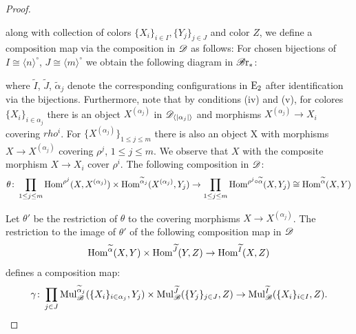 \begin{proof}
\begin{center}
        \end{center}
    along with collection of colors $\{X_i\}_{i \in I}, \{Y_j\}_{j \in J}$ and
    color $Z$, we define a composition map via the composition in $\mathscr{D}$ as
    follows: For chosen bijections of $I \cong \langle n \rangle^{\circ}$, $J
    \cong \langle m \rangle^{\circ}$ we obtain the following diagram in $\mathscr{B} \text{r}_{\ast}$:
    \begin{center}
    \end{center}
    where $\widetilde{I}$, $\widetilde{J}$, $\widetilde{\alpha}_j$ denote the
    corresponding configurations in $\operatorname{E}_2$ after identification via the
    bijections. Furthermore, note that by conditions (iv) and (v), for  colores
    $\{X_i\}_{i \in \alpha_j}$ there is an object $X^{(\alpha_j)}$ in
    $\mathscr{D}_{\langle |\alpha_j| \rangle}$ and morphisms $X^{(\alpha_j)} \to X_i$
    covering $rho^i$. For $\{X^{(\alpha_j)}\}_{1 \leq j \leq m}$ there is also
    an object X with morphisms $X \to X^{(\alpha_j)}$ covering $\rho^j$, $1 \leq
    j \leq m$. We observe that $X$ with the composite morphism $X \to X_i$ cover
    $\rho^i$. The following composition in $\mathscr{D}$:
    \[
       \theta \colon \prod_{1 \leq j \leq m} \operatorname{Hom}^{\rho^j}(X, X^{(\alpha_j)}) \times \operatorname{Hom}^{\widetilde{\alpha}_j}(X^{(\alpha_j)}, Y_j) \to \prod_{1 \leq j \leq m} \operatorname{Hom}^{\rho^j \circ \widetilde{\alpha}} (X, Y_j) \cong \operatorname{Hom}^{\widetilde{\alpha}}(X, Y)
    \]

    Let $\theta'$ be the restriction of $\theta$ to the covering morphisms $X
    \to X^{(\alpha_j)}$. The restriction to the image of $\theta'$ of the
    following composition map in $\mathscr{D}$
    \[
        \operatorname{Hom}^{\widetilde{\alpha}}(X, Y) \times \operatorname{Hom}^{\widetilde{J}}(Y, Z) \to \operatorname{Hom}^{\widetilde{I}}(X, Z)
    \]
    defines a composition map:
    \[
        \gamma \colon \prod_{j \in J} \operatorname{Mul}_{\mathscr{B}}^{\widetilde{\alpha}_j}(\{X_i\}_{i \in \alpha_j}, Y_j) \times \operatorname{Mul}_{\mathscr{B}}^{\widetilde{J}}(\{Y_j\}_{j \in J}, Z) \to \operatorname{Mul}_{\mathscr{B}}^{\widetilde{I}}(\{X_i\}_{i \in I}, Z).
    \]


\end{proof}
